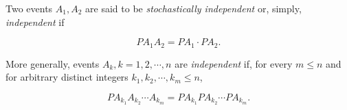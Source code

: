Two events $A_1, A_2$ are said to be \textit{stochastically independent} or, simply, \textit{independent} if

$$PA_1A_2 = PA_1 \cdot PA_2.$$

More generally, events $A_k, k = 1, 2, \cdots, n$ are \textit{independent} if, for every $m \leq n$ and for arbitrary distinct integers $k_1, k_2, \cdots, k_m \leq n$,

$$PA_{k_1}A_{k_2} \cdots A_{k_m} = PA_{k_1} PA_{k_2} \cdots PA_{k_m}.$$

